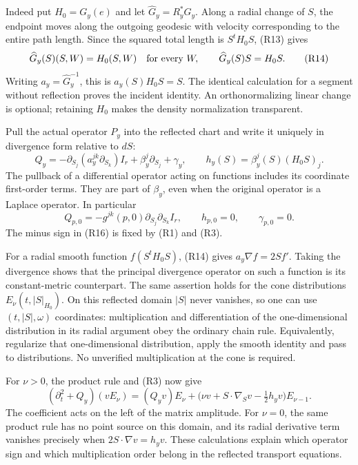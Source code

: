 \documentclass[
  11pt,
]{article}
\begin{document}
Indeed put \(H_0=G_y(e)\) and let \(\widehat G_y=R_y^*G_y\). Along a
radial change of \(S\), the endpoint moves along the outgoing geodesic
with velocity corresponding to the entire path length. Since the squared
total length is \(S^tH_0S\), (R13) gives \[
 \widehat G_y(S)(S,W)=H_0(S,W)\quad\hbox{for every }W,
 \qquad \widehat G_y(S)S=H_0S.                              \tag{R14}
\] Writing \(a_y=\widehat G_y^{-1}\), this is \(a_y(S)H_0S=S\). The
identical calculation for a segment without reflection proves the
incident identity. An orthonormalizing linear change is optional;
retaining \(H_0\) makes the density normalization transparent.

Pull the actual operator \(P_y\) into the reflected chart and write it
uniquely in divergence form relative to \(dS\): \[
 Q_y=-\partial_{S_j}(a_y^{jk}\partial_{S_k})I_r
                 +\beta_y^j\partial_{S_j}+\gamma_y,
 \qquad h_y(S)=\beta_y^j(S)(H_0S)_j.                        \tag{R15}
\] The pullback of a differential operator acting on functions includes
its coordinate first-order terms. They are part of \(\beta_y\), even
when the original operator is a Laplace operator. In particular \[
 Q_{p,0}=-g^{jk}(p,0)\partial_{S_j}\partial_{S_k}I_r,
 \qquad h_{p,0}=0,\qquad\gamma_{p,0}=0.                     \tag{R16}
\] The minus sign in (R16) is fixed by (R1) and (R3).

For a radial smooth function \(f(S^tH_0S)\), (R14) gives
\(a_y\nabla f=2Sf'\). Taking the divergence shows that the principal
divergence operator on such a function is its constant-metric
counterpart. The same assertion holds for the cone distributions
\(E_\nu(t,|S|_{H_0})\). On this reflected domain \(|S|\) never vanishes,
so one can use \((t,|S|,\omega)\) coordinates: multiplication and
differentiation of the one-dimensional distribution in its radial
argument obey the ordinary chain rule. Equivalently, regularize that
one-dimensional distribution, apply the smooth identity and pass to
distributions. No unverified multiplication at the cone is required.

For \(\nu>0\), the product rule and (R3) now give \[
 (\partial_t^2+Q_y)(vE_\nu)
  =(Q_yv)E_\nu+
     \big(\nu v+S\cdot\nabla_Sv-\tfrac12h_yv\big)E_{\nu-1}.
                                                               \tag{R17}
\] The coefficient acts on the left of the matrix amplitude. For
\(\nu=0\), the same product rule has no point source on this domain, and
its radial derivative term vanishes precisely when
\(2S\cdot\nabla v=h_yv\). These calculations explain which operator sign
and which multiplication order belong in the reflected transport
equations.
\end{document}
